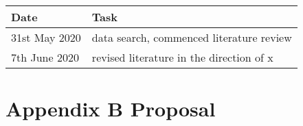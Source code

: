 \documentclass[
  12pt,
  oneside]{book}
\begin{document}
\begin{table}[H]
\centering
\begin{tabular}{ll}
\toprule
\textbf{Date} & \textbf{Task}\\
\midrule
31st May 2020 & data search, commenced literature review\\
7th June 2020 & revised literature in the direction of x\\
\bottomrule
\end{tabular}
\end{table}

\hypertarget{appendix-b-proposal}{%
\chapter*{Appendix B Proposal}\label{appendix-b-proposal}}

\enddocument

\printbibliography
\end{document}
